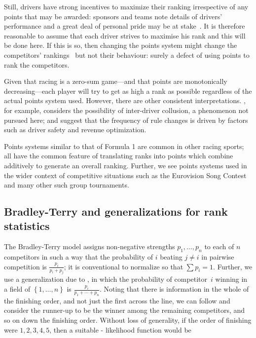 \documentclass{elsarticle}
\begin{document}
Still, drivers have strong incentives to maximize their ranking
irrespective of any points that may be awarded: sponsors and teams
note details of drivers' performance and a great deal of personal
pride may be at stake~\citep{gayrees2019}.  It is therefore reasonable
to assume that each driver strives to maximise his rank and this will
be done here.  If this is so, then changing the points system might
change the competitors' rankings~\citep{wood2020} but not their
behaviour: surely a defect of using points to rank the competitors.

Given that racing is a zero-sum game---and that points are
monotonically decreasing---each player will try to get as high a rank
as possible regardless of the actual points system used.  However,
there are other consistent interpretations. \cite{bakhrankova2011},
for example, considers the possibility of inter-driver collusion, a
phenomenon not pursued here; and \cite{mastromarco2009} suggest that
the frequency of rule changes is driven by factors such as driver
safety and revenue optimization.

Points systems similar to that of Formula 1 are common in other racing
sports; all have the common feature of translating ranks into points
which combine additively to generate an overall ranking.  Further, we
see points systems used in the wider context of competitive situations
such as the Eurovision Song Contest and many other such group
tournaments.

\subsection{Bradley-Terry and generalizations for rank
statistics}\label{bradley-terry-and-generalizations-for-rank-statistics}

The Bradley-Terry model \citep{bradley1952} assigns non-negative
strengths $p_1,\ldots, p_n$ to each of $n$ competitors in such a way
that the probability of $i$ beating $j\neq i$ in pairwise competition
is $\frac{p_i}{p_i+p_j}$; it is conventional to normalize so that
$\sum p_i=1$.  Further, we use a generalization due to
\citet{luce1959}, in which the probability of competitor~$i$ winning
in a field of $\left\lbrace 1,\ldots, n\right\rbrace$ is
$\frac{p_i}{p_1+\cdots +p_n}$.  Noting that there is information in the
whole of the finishing order, and not just the first across the line,
we can follow \cite{plackett1975} and consider the runner-up to be the
winner among the remaining competitors, and so on down the finishing
order. Without loss of generality, if the order of finishing were
$1,2,3,4,5$, then a suitable
\citeauthor{plackett1975}-\citeauthor{luce1959} likelihood function
would be
\end{document}

